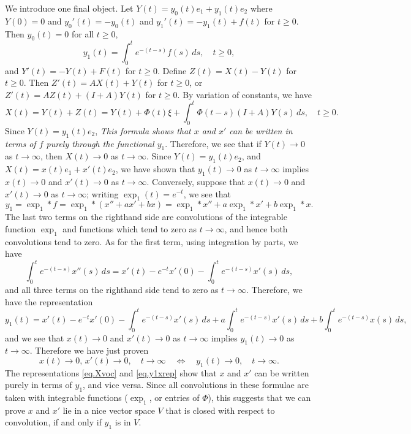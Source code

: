 \documentclass[10pt,reqno]{amsart}
\theoremstyle{definition}
\begin{document}
	We introduce one final object. Let $Y(t)=y_0(t)e_1+y_1(t)e_2$ where $Y(0)=0$ and $y_0'(t)=-y_0(t)$ and $y_1'(t)=-y_1(t)+f(t)$ for $t\geq 0$. Then $y_0(t)=0$ for all $t\geq 0$, 
	\begin{equation} \label{eq.y1}
		y_1(t)=\int_0^t e^{-(t-s)}f(s)\,ds, \quad t\geq 0,
	\end{equation}
	and $Y'(t)=-Y(t)+F(t)$ for $t\geq 0$. Define $Z(t)=X(t)-Y(t)$ for $t\geq 0$. Then $Z'(t)=AX(t)+Y(t)$ for $t\geq 0$, or $Z'(t)=AZ(t)+(I+A)Y(t)$ for $t\geq 0$. By variation of constants, we have 
	\begin{equation} \label{eq.Xvoc}
		X(t)=Y(t)+Z(t)=Y(t)+\Phi(t)\xi+\int_0^t \Phi(t-s)(I+A)Y(s)\,ds, \quad t\geq 0.
	\end{equation}
	Since $Y(t)=y_1(t)e_2$, \textit{This formula shows that $x$ and $x'$ can be written in terms of $f$ purely through the functional $y_1$}.
	Therefore, we see that if $Y(t)\to 0$ as $t\to\infty$, then $X(t)\to 0$ as $t\to\infty$. Since $Y(t)=y_1(t)e_2$, and $X(t)=x(t)e_1+x'(t)e_2$, we have shown that $y_1(t)\to 0$ as $t\to\infty$ implies $x(t)\to 0$ and $x'(t)\to 0$ as $t\to\infty$. Conversely, suppose that $x(t)\to 0$ and $x'(t)\to 0$ as $t\to\infty$; writing $\exp_1(t)=e^{-t}$, we see that 
	\[
	y_1=\exp_1\ast f = \exp_1
	\ast (x''+ax'+bx)
	=\exp_1*x''+a\exp_1*x'+b\exp_1*x.
	\]
	The last two terms on the righthand side are convolutions of the integrable function $\exp_1$ and functions which tend to zero as $t\to \infty$, and hence both convolutions tend to zero. 
	As for the first term, using integration by parts, we have 
	\[
	\int_0^t e^{-(t-s)}x''(s)\,ds
	= x'(t)-e^{-t}x'(0) - \int_0^t e^{-(t-s)}x'(s)\,ds,
	\]	
	and all three terms on the righthand side tend to zero as $t\to\infty$. Therefore, we have the representation
	\begin{equation} \label{eq.y1xrep}
		y_1(t)=x'(t)-e^{-t}x'(0) - \int_0^t e^{-(t-s)}x'(s)\,ds+a\int_0^t e^{-(t-s)}x'(s)\,ds + b \int_0^t e^{-(t-s)}x(s)\,ds,
	\end{equation}
	and we see that $x(t)\to 0$ and $x'(t)\to 0$ as $t\to\infty$ implies $y_1(t)\to 0$ as $t\to\infty$. Therefore we have just proven 
	\[
	x(t)\to 0, \, x'(t)\to 0, \quad t\to\infty \quad \Longleftrightarrow \quad y_1(t)\to 0, \quad t\to\infty. 
	\]
	The representations \eqref{eq.Xvoc} and \eqref{eq.y1xrep} show that $x$ and $x'$ can be written purely in terms of $y_1$, and vice versa. Since all convolutions in these formulae are taken with integrable functions ($\exp_1$, or entries of $\Phi$), this suggests that we can prove  $x$ and $x'$ lie in a nice vector space $V$ that is closed with respect to convolution, if and only if $y_1$ is in $V$.
	
\end{document}
